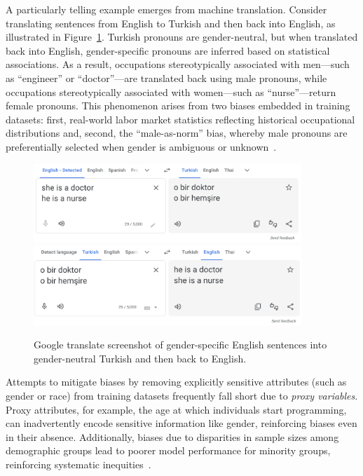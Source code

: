 A particularly telling example emerges from machine translation.
Consider translating sentences from English to Turkish and then back
into English, as illustrated in Figure~\ref{fig:eng-to-turkish}.
Turkish pronouns are gender-neutral,
but when translated back into English, gender-specific pronouns are
inferred based on statistical associations. As a result, occupations
stereotypically associated with men—such as ``engineer'' or
``doctor''—are translated back using male pronouns, while occupations
stereotypically associated with women—such as ``nurse''—return female
pronouns. This phenomenon arises from two biases embedded in training
datasets: first, real-world labor market statistics reflecting historical
occupational distributions and, second, the ``male-as-norm'' bias, whereby
male pronouns are preferentially selected when gender is ambiguous or
unknown~\cite{caliskan2017semantics}.

\begin{figure}[h]
  \centering
  \includegraphics[width=0.9\textwidth]{sections/background/eng-to-turkish.png}
  \includegraphics[width=0.9\textwidth]{sections/background/turkish-to-eng.png}
  \caption{Google translate screenshot of gender-specific English sentences into
  gender-neutral Turkish and then back to English.}
  \label{fig:eng-to-turkish}
\end{figure}

Attempts to mitigate biases by removing explicitly sensitive
attributes (such as gender or race) from training datasets frequently
fall short due to \textit{proxy variables}. Proxy attributes, for example,
the age at which individuals start programming, can inadvertently
encode sensitive information like gender, reinforcing biases even in
their absence. Additionally, biases due to disparities in sample
sizes among demographic groups lead to poorer model performance for
minority groups, reinforcing systematic inequities~\cite{barocas2016big}.

